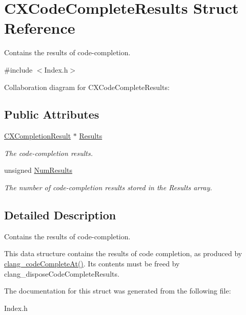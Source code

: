 \hypertarget{structCXCodeCompleteResults}{}\section{C\+X\+Code\+Complete\+Results Struct Reference}
\label{structCXCodeCompleteResults}


Contains the results of code-\/completion.  




{\ttfamily \#include $<$Index.\+h$>$}



Collaboration diagram for C\+X\+Code\+Complete\+Results\+:
\subsection*{Public Attributes}
\begin{DoxyCompactItemize}
\item 
\mbox{\label{structCXCodeCompleteResults_af907ee1afe92c439ec6b804650fcb0d2}} 
\hyperlink{structCXCompletionResult}{C\+X\+Completion\+Result} $\ast$ \hyperlink{structCXCodeCompleteResults_af907ee1afe92c439ec6b804650fcb0d2}{Results}
\begin{DoxyCompactList}\small\item\em The code-\/completion results. \end{DoxyCompactList}\item 
\mbox{\label{structCXCodeCompleteResults_ac9198de1f98a2df4783008d9dbe9cdcc}} 
unsigned \hyperlink{structCXCodeCompleteResults_ac9198de1f98a2df4783008d9dbe9cdcc}{Num\+Results}
\begin{DoxyCompactList}\small\item\em The number of code-\/completion results stored in the {\ttfamily Results} array. \end{DoxyCompactList}\end{DoxyCompactItemize}


\subsection{Detailed Description}
Contains the results of code-\/completion. 

This data structure contains the results of code completion, as produced by {\ttfamily \hyperlink{group__CINDEX__CODE__COMPLET_ga50fedfa85d8d1517363952f2e10aa3bf}{clang\+\_\+code\+Complete\+At()}}. Its contents must be freed by {\ttfamily clang\+\_\+dispose\+Code\+Complete\+Results}. 

The documentation for this struct was generated from the following file\+:\begin{DoxyCompactItemize}
\item 
Index.\+h\end{DoxyCompactItemize}
